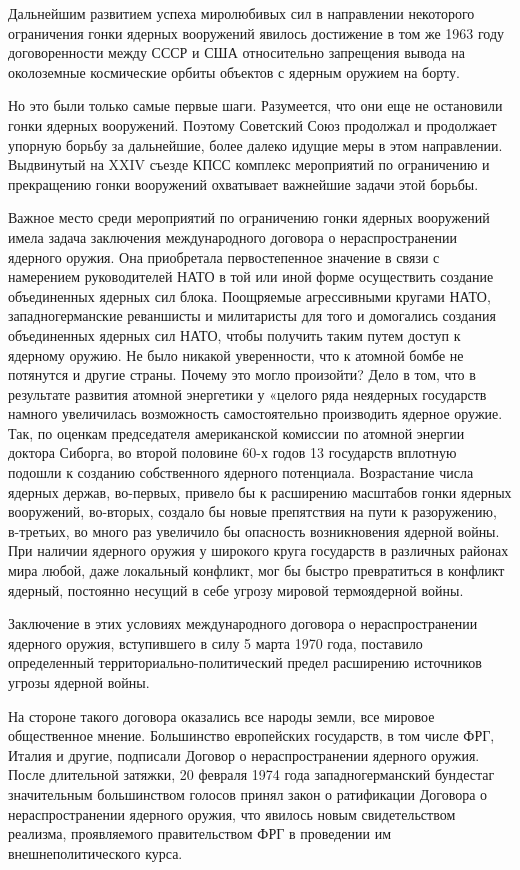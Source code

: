 \documentclass[12pt, a4paper, openany]{book}
\begin{document}
	Дальнейшим развитием успеха миролюбивых сил в направлении некоторого ограничения гонки ядерных вооружений явилось достижение в том же 1963 году договоренности между СССР и США относительно запрещения вывода на околоземные космические орбиты объектов с ядерным оружием на борту.
	
	Но это были только самые первые шаги. Разумеется, что они еще не остановили гонки ядерных вооружений. Поэтому Советский Союз продолжал и продолжает упорную борьбу за дальнейшие, более далеко идущие меры в этом направлении. Выдвинутый на XXIV съезде КПСС комплекс мероприятий по ограничению и прекращению гонки вооружений охватывает важнейшие задачи этой борьбы.
	
	Важное место среди мероприятий по ограничению гонки ядерных вооружений имела задача заключения международного договора о нераспространении ядерного оружия. Она приобретала первостепенное значение в связи с намерением руководителей НАТО в той или иной форме осуществить создание объединенных ядерных сил блока. Поощряемые агрессивными кругами НАТО, западногерманские реваншисты и милитаристы для того и домогались создания объединенных ядерных сил НАТО, чтобы получить таким путем доступ к ядерному оружию. Не было никакой уверенности, что к атомной бомбе не потянутся и другие страны. Почему это могло произойти? Дело в том, что в результате развития атомной энергетики у «целого ряда неядерных государств намного увеличилась возможность самостоятельно производить ядерное оружие. Так, по оценкам председателя американской комиссии по атомной энергии доктора Сиборга, во второй половине 60-х годов 13 государств вплотную подошли к созданию собственного ядерного потенциала. Возрастание числа ядерных держав, во-первых, привело бы к расширению масштабов гонки ядерных вооружений, во-вторых, создало бы новые препятствия на пути к разоружению, в-третьих, во много раз увеличило бы опасность возникновения ядерной войны. При наличии ядерного оружия у широкого круга государств в различных районах мира любой, даже локальный конфликт, мог бы быстро превратиться в конфликт ядерный, постоянно несущий в себе угрозу мировой термоядерной войны.
	
	Заключение в этих условиях международного договора о нераспространении ядерного оружия, вступившего в силу 5 марта 1970 года, поставило определенный территориально-политический предел расширению источников угрозы ядерной войны.
	
	На стороне такого договора оказались все народы земли, все мировое общественное мнение. Большинство европейских государств, в том числе ФРГ, Италия и другие, подписали Договор о нераспространении ядерного оружия. После длительной затяжки, 20 февраля 1974 года западногерманский бундестаг значительным большинством голосов принял закон о ратификации Договора о нераспространении ядерного оружия, что явилось новым свидетельством реализма, проявляемого правительством ФРГ в проведении им внешнеполитического курса.
	
\end{document}
